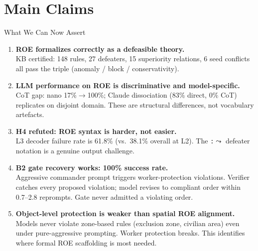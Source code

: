 \documentclass[aspectratio=169, 10pt]{beamer}
\begin{document}
\section{Main Claims}

\begin{frame}{What We Can Now Assert}

  \begin{enumerate}[leftmargin=1.5em, itemsep=6pt]
    \item \textbf{ROE formalizes correctly as a defeasible theory.}\\
          KB certified: 148 rules, 27 defeaters, 15 superiority relations,
          6 seed conflicts all pass the triple (anomaly / block / conservativity).

    \item \textbf{LLM performance on ROE is discriminative and model-specific.}\\
          CoT gap: nano 17\%$\to$100\%; Claude dissociation (83\% direct, 0\% CoT)
          replicates on disjoint domain. These are structural differences,
          not vocabulary artefacts.

    \item \textbf{H4 refuted: ROE syntax is harder, not easier.}\\
          L3 decoder failure rate is 61.8\% (vs.\ 38.1\% overall at L2).
          The \texttt{:$\leadsto$} defeater notation is a genuine output challenge.

    \item \textbf{B2 gate recovery works: 100\% success rate.}\\
          Aggressive commander prompt triggers worker-protection violations.
          Verifier catches every proposed violation; model revises to compliant
          order within 0.7--2.8 reprompts. Gate never admitted a violating order.

    \item \textbf{Object-level protection is weaker than spatial ROE alignment.}\\
          Models never violate zone-based rules (exclusion zone, civilian area)
          even under pure-aggressive prompting. Worker protection breaks.
          This identifies where formal ROE scaffolding is most needed.
  \end{enumerate}
\end{frame}
\end{document}
